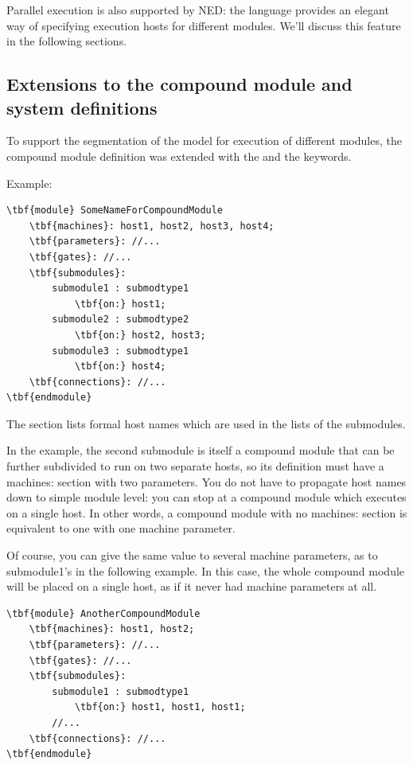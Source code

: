 Parallel execution is also supported by NED: the language provides 
an elegant way of specifying execution hosts for different modules. 
We'll discuss this feature in the following sections.





\subsection{Extensions to the compound module and system definitions}

To support the segmentation of the model for
execution of different modules, the compound module definition was
extended with the  and the  keywords.

Example:
\begin{Verbatim}[commandchars=\\\{\}]
\tbf{module} SomeNameForCompoundModule
    \tbf{machines}: host1, host2, host3, host4;
    \tbf{parameters}: //...
    \tbf{gates}: //...
    \tbf{submodules}: 
        submodule1 : submodtype1
            \tbf{on:} host1;
        submodule2 : submodtype2
            \tbf{on:} host2, host3;
        submodule3 : submodtype1
            \tbf{on:} host4;
    \tbf{connections}: //...
\tbf{endmodule}
\end{Verbatim}


The  section lists formal host
names which are used in the  lists of the
submodules.


In the example, the second submodule is itself a compound module that
can be further subdivided to run on two separate hosts, so its
definition must have a machines: section with two parameters.  You do
not have to propagate host names down to simple module level: you can
stop at a compound module which executes on a single host. In other
words, a compound module with no machines: section is equivalent to
one with one machine parameter.

Of course, you can give the same value to several machine parameters,
as to submodule1's in the following example. In this case, the whole
compound module will be placed on a single host, as if it never had
machine parameters at all.


\begin{Verbatim}[commandchars=\\\{\}]
\tbf{module} AnotherCompoundModule
    \tbf{machines}: host1, host2;
    \tbf{parameters}: //...
    \tbf{gates}: //...
    \tbf{submodules}: 
        submodule1 : submodtype1
            \tbf{on:} host1, host1, host1;
        //...
    \tbf{connections}: //...
\tbf{endmodule}
\end{Verbatim}


